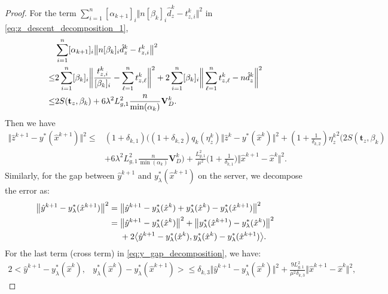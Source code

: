 \documentclass{article}
\theoremstyle{plain}
\theoremstyle{definition}
\theoremstyle{remark}
\begin{document}
\begin{proof}
    For the term $\sum_{i=1}^{n}[\alpha_{k+1}]_{i}\Big\Vert n[\beta_{k}]_{i}\hat{d}_{z}^{k}- t_{z,i}^{k} \Big\Vert^{2}$ in \eqref{eq:z_descent_decomposition_1},
	\begin{align}
		&\sum_{i=1}^{n}[\alpha_{k+1}]_{i}\big\Vert n[\beta_{k}]_{i}\hat{d}_{z}^{k}- t_{z,i}^{k} \big\Vert^{2} \notag\\
		\leq
		&2\sum_{i=1}^{n}[\beta_{k}]_{i}\bigg\Vert  \frac{t_{z,i}^{k}}{[\beta_{k}]_{i}} -\sum_{\ell=1}^{n}t_{z,\ell}^{k}\bigg\Vert^{2}+2\sum_{i=1}^{n}[\beta_{k}]_{i}\bigg\Vert \sum_{\ell=1}^{n}t_{z,\ell}^{k}-n\hat{d}_{z}^{k}\bigg\Vert^{2} \notag\\
		\leq
		&2S(\mathbf{t}_{z},\beta_{k})+6\lambda^{2}L_{g,1}^{2}\frac{n}{\min(\alpha_{k})}\mathbf{V}_{D}^{k}.
	\end{align}
	Then we have 
	\begin{align*}
		\big\Vert\hat{z}^{k+1}-y^*(\hat{x}^{k+1})\big\Vert^2
		\leq
		&(1+\delta_{k,1})\bigg((1+\delta_{k,2})q_{k}(\eta_{z}^{k})\big\Vert\hat{z}^{k}- y^*(\hat{x}^{k})\big\Vert^{2}+(1+\frac{1}{\delta_{k,2}}){\eta_z^{k}}^{2}\big(2S(\mathbf{t}_{z},\beta_{k})\\
        &+6\lambda^{2}L_{g,1}^{2}\frac{n}{\min(\alpha_{k})}\mathbf{V}_{D}^{k} \bigg)
        +\frac{L_{g,1}^{2}}{\mu^{2}}\big(1+\frac{1}{\delta_{k,1}}\big)\big\Vert\hat{x}^{k+1}- \hat{x}^{k}\big\Vert^{2}.
	\end{align*}
Similarly, for the gap between $\hat{y}^{k+1}$ and $y_{\lambda}^{*}(\hat{x}^{k+1})$ on the server, we decompose the error as:
\begin{align}\label{eq:y_gap_decomposition}
    \big\Vert\hat{y}^{k+1}-y_{\lambda}^*(\hat{x}^{k+1})\big\Vert^2 ={}& \big\Vert\hat{y}^{k+1}-y_{\lambda}^*(\hat{x}^{k}) + y_{\lambda}^*(\hat{x}^{k}) - y_{\lambda}^*(\hat{x}^{k+1})\big\Vert^2 \notag \\
    ={}& \big\Vert\hat{y}^{k+1}-y_{\lambda}^*(\hat{x}^{k})\big\Vert^{2} + \big\Vert y_{\lambda}^*(\hat{x}^{k+1})-y_{\lambda}^*(\hat{x}^{k})\big\Vert^{2} \notag \\
    &+ 2\big<\hat{y}^{k+1}-y_{\lambda}^*(\hat{x}^{k}), y_{\lambda}^*(\hat{x}^{k})-y_{\lambda}^*(\hat{x}^{k+1})\big>.
\end{align}
For the last term (cross term) in \eqref{eq:y_gap_decomposition}, we have:
\begin{align}\label{eq:y_cross_term}
    2\big< \hat{y}^{k+1}-y_{\lambda}^*(\hat{x}^{k}), & y_{\lambda}^*(\hat{x}^{k})-y_{\lambda}^*(\hat{x}^{k+1})\big> 
    \leq \delta_{k,3} \big\Vert\hat{y}^{k+1}-y_{\lambda}^*(\hat{x}^{k})\big\Vert^{2} + \frac{9L_{g,1}^{2}}{\mu^{2}\delta_{k,3}}\big\Vert\hat{x}^{k+1}- \hat{x}^{k}\big\Vert^{2},

\end{align}
\end{proof}
\end{document}
